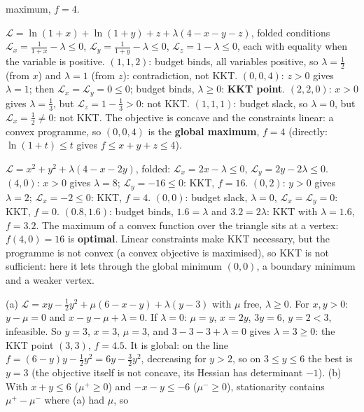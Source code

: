 \begin{solutions}
        maximum, $f=4$.
  \item $\mathcal{L}=\ln(1+x)+\ln(1+y)+z+\lambda(4-x-y-z)$, folded
        conditions $\mathcal{L}_{x}=\tfrac1{1+x}-\lambda\le0$,
        $\mathcal{L}_y=\tfrac1{1+y}-\lambda\le0$, $\mathcal{L}_z=1-\lambda\le0$,
        each with equality when the variable is positive.
        $(1,1,2)$: budget binds, all variables positive, so $\lambda=\tfrac12$
        (from $x$) and $\lambda=1$ (from $z$): contradiction, not KKT.
        $(0,0,4)$: $z>0$ gives $\lambda=1$; then
        $\mathcal{L}_x=\mathcal{L}_y=0\le0$; budget binds, $\lambda\ge0$:
        \textbf{KKT point}. $(2,2,0)$: $x>0$ gives $\lambda=\tfrac13$, but
        $\mathcal{L}_z=1-\tfrac13>0$: not KKT. $(1,1,1)$: budget slack, so
        $\lambda=0$, but $\mathcal{L}_x=\tfrac12\neq0$: not KKT. The
        objective is concave and the constraints linear: a convex
        programme, so $(0,0,4)$ is the \textbf{global maximum}, $f=4$
        (directly: $\ln(1+t)\le t$ gives $f\le x+y+z\le4$).
  \item $\mathcal{L}=x^{2}+y^{2}+\lambda(4-x-2y)$, folded:
        $\mathcal{L}_x=2x-\lambda\le0$, $\mathcal{L}_y=2y-2\lambda\le0$.
        $(4,0)$: $x>0$ gives $\lambda=8$; $\mathcal{L}_y=-16\le0$: KKT,
        $f=16$. $(0,2)$: $y>0$ gives $\lambda=2$; $\mathcal{L}_x=-2\le0$:
        KKT, $f=4$. $(0,0)$: budget slack, $\lambda=0$,
        $\mathcal{L}_x=\mathcal{L}_y=0$: KKT, $f=0$. $(0.8,1.6)$: budget
        binds, $1.6=\lambda$ and $3.2=2\lambda$: KKT with $\lambda=1.6$,
        $f=3.2$. The maximum of a convex function over the triangle sits at
        a vertex: $f(4,0)=16$ is \textbf{optimal}. Linear constraints make
        KKT necessary, but the programme is not convex (a convex objective
        is maximised), so KKT is not sufficient: here it lets through the
        global minimum $(0,0)$, a boundary minimum and a weaker vertex.
  \item (a) $\mathcal{L}=xy-\tfrac12y^{2}+\mu(6-x-y)+\lambda(y-3)$ with
        $\mu$ free, $\lambda\ge0$. For $x,y>0$: $y-\mu=0$ and
        $x-y-\mu+\lambda=0$. If $\lambda=0$: $\mu=y$, $x=2y$, $3y=6$, $y=2<3$,
        infeasible. So $y=3$, $x=3$, $\mu=3$, and $3-3-3+\lambda=0$ gives
        $\lambda=3\ge0$: the KKT point $(3,3)$, $f=4.5$. It is global: on
        the line $f=(6-y)y-\tfrac12y^{2}=6y-\tfrac32y^{2}$, decreasing for
        $y>2$, so on $3\le y\le6$ the best is $y=3$ (the objective itself is
        not concave, its Hessian has determinant $-1$).
        (b) With $x+y\le6$ ($\mu^{+}\ge0$) and $-x-y\le-6$ ($\mu^{-}\ge0$),
        stationarity contains $\mu^{+}-\mu^{-}$ where (a) had $\mu$, so

\end{solutions}
